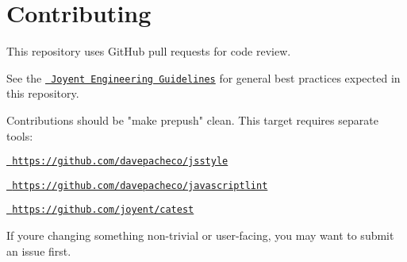 \chapter{Contributing}
\hypertarget{md__2_users_2hello_2_documents_2_git_hub_2finalproject-engine-drop-table-engines_2_engine_2src_259ad2a96bd9b85ce276994fbd1a43328}{}\label{md__2_users_2hello_2_documents_2_git_hub_2finalproject-engine-drop-table-engines_2_engine_2src_259ad2a96bd9b85ce276994fbd1a43328}
\label{md__2_users_2hello_2_documents_2_git_hub_2finalproject-engine-drop-table-engines_2_engine_2src_259ad2a96bd9b85ce276994fbd1a43328_autotoc_md4858}%
%


This repository uses Git\+Hub pull requests for code review.

See the \href{https://github.com/joyent/eng/blob/master/docs/index.md}{\texttt{ Joyent Engineering Guidelines}} for general best practices expected in this repository.

Contributions should be "{}make prepush"{} clean. This target requires separate tools\+:


\begin{DoxyItemize}
\item \href{https://github.com/davepacheco/jsstyle}{\texttt{ https\+://github.\+com/davepacheco/jsstyle}}
\item \href{https://github.com/davepacheco/javascriptlint}{\texttt{ https\+://github.\+com/davepacheco/javascriptlint}}
\item \href{https://github.com/joyent/catest}{\texttt{ https\+://github.\+com/joyent/catest}}
\end{DoxyItemize}

If you\textquotesingle{}re changing something non-\/trivial or user-\/facing, you may want to submit an issue first. 